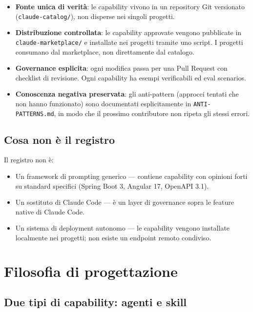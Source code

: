 \documentclass[12pt,a4paper,twoside]{book}
\begin{document}
\begin{itemize}
  \item \textbf{Fonte unica di verità}: le capability vivono in un repository Git versionato (\texttt{claude-catalog/}), non disperse nei singoli progetti.
  \item \textbf{Distribuzione controllata}: le capability approvate vengono pubblicate in \texttt{claude-marketplace/} e installate nei progetti tramite uno script. I progetti consumano dal marketplace, non direttamente dal catalogo.
  \item \textbf{Governance esplicita}: ogni modifica passa per una Pull Request con checklist di revisione. Ogni capability ha esempi verificabili ed eval scenarios.
  \item \textbf{Conoscenza negativa preservata}: gli anti-pattern (approcci tentati che non hanno funzionato) sono documentati esplicitamente in \texttt{ANTI-PATTERNS.md}, in modo che il prossimo contributore non ripeta gli stessi errori.
\end{itemize}

\section{Cosa non è il registro}

Il registro non è:
\begin{itemize}
  \item Un framework di prompting generico — contiene capability con opinioni forti su standard specifici (Spring Boot 3, Angular 17, OpenAPI 3.1).
  \item Un sostituto di Claude Code — è un layer di governance sopra le feature native di Claude Code.
  \item Un sistema di deployment autonomo — le capability vengono installate localmente nei progetti; non esiste un endpoint remoto condiviso.
\end{itemize}

\chapter{Filosofia di progettazione}

\section{Due tipi di capability: agenti e skill}
\end{document}
